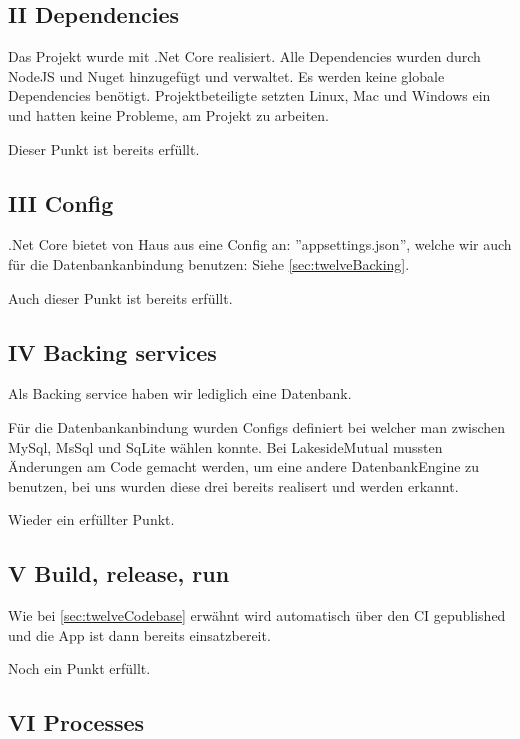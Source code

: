\documentclass[11pt,titlepage]{article}
\begin{document}
\subsection{II Dependencies}
\label{sec:twelveDependencies}

Das Projekt wurde mit .Net Core realisiert. Alle Dependencies wurden durch NodeJS und Nuget hinzugefügt und verwaltet. Es werden keine globale Dependencies benötigt. 
Projektbeteiligte setzten Linux, Mac und Windows ein und hatten keine Probleme, am Projekt zu arbeiten.
\par\medskip
Dieser Punkt ist bereits erfüllt.

\subsection{III Config}
\label{sec:twelveConfig}

.Net Core bietet von Haus aus eine Config an: ''appsettings.json'', welche wir auch für die Datenbankanbindung benutzen: 
Siehe \autoref{sec:twelveBacking}.
\par\medskip
Auch dieser Punkt ist bereits erfüllt.

\subsection{IV Backing services}
\label{sec:twelveBacking}

Als Backing service haben wir lediglich eine Datenbank.

Für die Datenbankanbindung wurden Configs definiert bei welcher man zwischen MySql, MsSql und SqLite wählen konnte. 
Bei LakesideMutual mussten Änderungen am Code gemacht werden, um eine andere DatenbankEngine zu benutzen, bei uns wurden diese drei bereits realisert und werden erkannt.
\par\medskip
Wieder ein erfüllter Punkt.

\subsection{V Build, release, run}
\label{sec:twelveBuild}

Wie bei \autoref{sec:twelveCodebase} erwähnt wird automatisch über den CI gepublished und die App ist dann bereits einsatzbereit.
\par\medskip
Noch ein Punkt erfüllt.

\subsection{VI Processes}
\label{sec:twelveProcesses}
\end{document}
